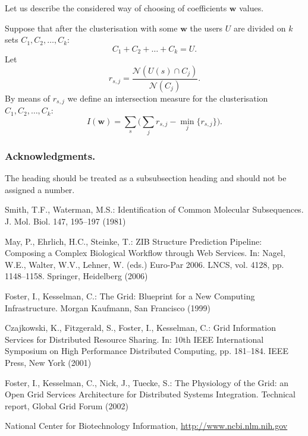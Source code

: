 \documentclass[runningheads,a4paper]{llncs}
\begin{document}
Let us describe the considered way of choosing of coefficients $\boldsymbol{w}$ values.

Suppose that after the clusterisation with some $\boldsymbol{w}$ the users $U$ are divided on $k$ sets $C_1, C_2, \dots, C_k$:
\[
	C_1 + C_2 + \dots + C_k = U.
\]
Let
\[
	r_{s,j} = \frac{\mathcal{N}(U(s) \cap C_j)}{\mathcal{N}(C_j)}.
\]
By means of $r_{s,j}$ we define an intersection measure for the clusterisation $C_1, C_2, \dots, C_k$:
\[
	I(\boldsymbol{w}) = \sum_s \Big( \sum_j r_{s,j} - \min_j \{r_{s,j}\} \Big).
\]









\subsubsection*{Acknowledgments.} The heading should be treated as a
subsubsection heading and should not be assigned a number.

\begin{thebibliography}{4}

 Smith, T.F., Waterman, M.S.: Identification of Common Molecular
Subsequences. J. Mol. Biol. 147, 195--197 (1981)

 May, P., Ehrlich, H.C., Steinke, T.: ZIB Structure Prediction Pipeline:
Composing a Complex Biological Workflow through Web Services. In: Nagel,
W.E., Walter, W.V., Lehner, W. (eds.) Euro-Par 2006. LNCS, vol. 4128,
pp. 1148--1158. Springer, Heidelberg (2006)

 Foster, I., Kesselman, C.: The Grid: Blueprint for a New Computing
Infrastructure. Morgan Kaufmann, San Francisco (1999)

 Czajkowski, K., Fitzgerald, S., Foster, I., Kesselman, C.: Grid
Information Services for Distributed Resource Sharing. In: 10th IEEE
International Symposium on High Performance Distributed Computing, pp.
181--184. IEEE Press, New York (2001)

 Foster, I., Kesselman, C., Nick, J., Tuecke, S.: The Physiology of the
Grid: an Open Grid Services Architecture for Distributed Systems
Integration. Technical report, Global Grid Forum (2002)

 National Center for Biotechnology Information, \url{http://www.ncbi.nlm.nih.gov}

\end{thebibliography}
\end{document}
